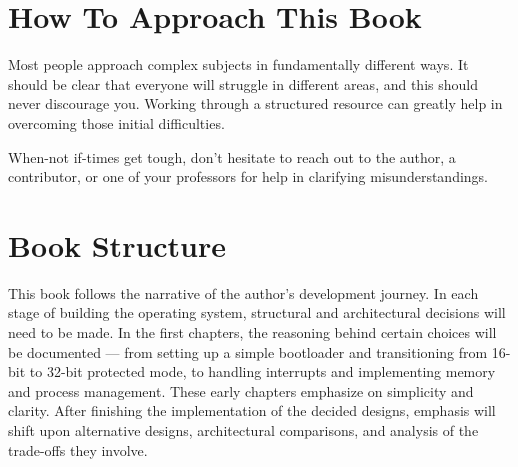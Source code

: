 \section{How To Approach This Book}

Most people approach complex subjects in fundamentally different ways. It should be clear that everyone 
will struggle in different areas, and this should never discourage you. Working through a structured 
resource can greatly help in overcoming those initial difficulties.

When-not if-times get tough, don't hesitate to reach out to the author, a contributor, or one of your professors 
for help in clarifying misunderstandings.

\section{Book Structure}

This book follows the narrative of the author's development journey. In each stage of building the operating 
system, structural and architectural decisions will need to be made. In the first chapters, the reasoning behind 
certain choices will be documented — from setting up a simple bootloader and transitioning from 16-bit to 
32-bit protected mode, to handling interrupts and implementing memory and process management. These early 
chapters emphasize on simplicity and clarity. After finishing the implementation of the decided designs, emphasis 
will shift upon alternative designs, architectural comparisons, and analysis of the trade-offs they involve.